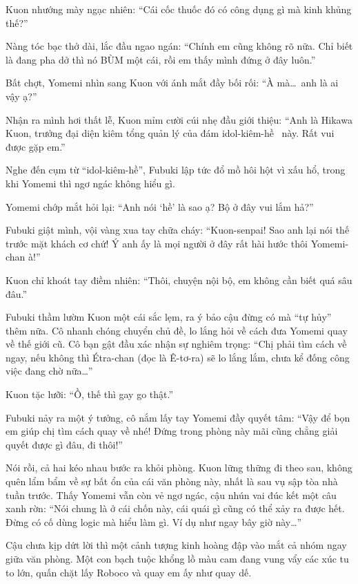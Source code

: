 \documentclass[../main.tex]{subfiles}
\begin{document}
Kuon nhướng mày ngạc nhiên: ``Cái cốc thuốc đó có công dụng gì mà kinh khủng thế?''

Nàng tóc bạc thở dài, lắc đầu ngao ngán: ``Chính em cũng không rõ nữa. Chỉ biết là đang pha dở thì nó BÙM một cái, rồi em thấy mình đứng ở đây luôn.''

Bất chợt, Yomemi nhìn sang Kuon với ánh mắt đầy bối rối: ``À mà\dots\ anh là ai vậy ạ?''

Nhận ra mình hơi thất lễ, Kuon mỉm cười cúi nhẹ đầu giới thiệu: ``Anh là Hikawa Kuon, trưởng đại diện kiêm tổng quản lý của đám idol-kiêm-hề \hll\ này. Rất vui được gặp em.''

Nghe đến cụm từ ``idol-kiêm-hề'', Fubuki lập tức đổ mồ hôi hột vì xấu hổ, trong khi Yomemi thì ngơ ngác không hiểu gì.

Yomemi chớp mắt hỏi lại: ``Anh nói `hề' là sao ạ? Bộ ở đây vui lắm hả?''

Fubuki giật mình, vội vàng xua tay chữa cháy: ``Kuon-senpai! Sao anh lại nói thế trước mặt khách cơ chứ! Ý anh ấy là mọi người ở đây rất hài hước thôi Yomemi-chan à!''

Kuon chỉ khoát tay điềm nhiên: ``Thôi, chuyện nội bộ, em không cần biết quá sâu đâu.''

Fubuki thầm lườm Kuon một cái sắc lẹm, ra ý bảo cậu đừng có mà ``tự hủy'' thêm nữa. Cô nhanh chóng chuyển chủ đề, lo lắng hỏi về cách đưa Yomemi quay về thế giới cũ. Cô bạn gật đầu xác nhận sự nghiêm trọng: ``Chị phải tìm cách về ngay, nếu không thì Étra-chan (đọc là Ê-tơ-ra) sẽ lo lắng lắm, chưa kể đống công việc đang chờ nữa\dots''

Kuon tặc lưỡi: ``Ồ, thế thì gay go thật.''

Fubuki nảy ra một ý tưởng, cô nắm lấy tay Yomemi đầy quyết tâm: ``Vậy để bọn em giúp chị tìm cách quay về nhé! Đứng trong phòng này mãi cũng chẳng giải quyết được gì đâu, đi thôi!''

Nói rồi, cả hai kéo nhau bước ra khỏi phòng. Kuon lững thững đi theo sau, không quên lẩm bẩm về sự bất ổn của cái văn phòng này, nhất là sau vụ sập tòa nhà tuần trước. Thấy Yomemi vẫn còn vẻ ngơ ngác, cậu nhún vai đúc kết một câu xanh rờn: ``Nói chung là ở cái chốn này, cái quái gì cũng có thể xảy ra được hết. Đừng có cố dùng logic mà hiểu làm gì. Ví dụ như ngay bây giờ này\dots''


Cậu chưa kịp dứt lời thì một cảnh tượng kinh hoàng đập vào mắt cả nhóm ngay giữa văn phòng. Một con bạch tuộc khổng lồ màu cam đang vung vẩy các xúc tu to lớn, quấn chặt lấy Roboco và quay em ấy như quay dế.
\end{document}
